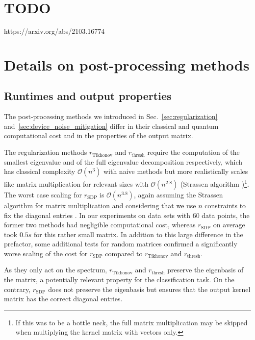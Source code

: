\documentclass[twocolumn,superscriptaddress,nofootinbib]{revtex4-2}
\begin{document}
\section*{TODO}
https://arxiv.org/abs/2103.16774




\appendix

\section{Details on post-processing methods}\label{sec:postprocessing_app}
\subsection{Runtimes and output properties}\label{sec:postprocessing_details}
The post-processing methods we introduced in Sec.~\ref{sec:regularization} and~\ref{sec:device_noise_mitigation} differ in their classical and quantum computational cost and in the properties of the output matrix.

The regularization methods $r_\mathrm{Tikhonov}$ and $r_\mathrm{thresh}$ require the computation of the smallest eigenvalue and of the full eigenvalue decomposition respectively, which has classical complexity $\mathcal{O}(n^3)$ with naive methods but more realistically scales like matrix multiplication for relevant sizes with $\mathcal{O}(n^{2.8})$ (Strassen algorithm \cite{strassen1969gaussian})\footnote{If this was to be a bottle neck, the full matrix multiplication may be skipped when multiplying the kernel matrix with vectors only.}.
The worst case scaling for $r_\mathrm{SDP}$ is $\mathcal{O}(n^{3.8})$, again assuming the Strassen algorithm for matrix multiplication and considering that we use $n$ constraints to fix the diagonal entries \cite{lee2015faster, strassen1969gaussian}.
In our experiments on data sets with $60$ data points, the former two methods had negligible computational cost, whereas $r_\mathrm{SDP}$ on average took $0.5s$ for this rather small matrix.
In addition to this large difference in the prefactor, some additional tests for random matrices confirmed a significantly worse scaling of the cost for $r_\mathrm{SDP}$ compared to $r_\mathrm{Tikhonov}$ and $r_\mathrm{thresh}$.

As they only act on the spectrum, $r_\mathrm{Tikhonov}$ and $r_\mathrm{thresh}$ preserve the eigenbasis of the matrix, a potentially relevant property for the classification task.
On the contrary, $r_\mathrm{SDP}$ does not preserve the eigenbasis but ensures that the output kernel matrix has the correct diagonal entries.
\end{document}
